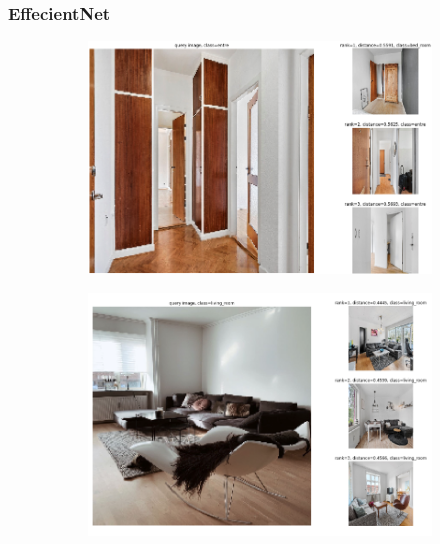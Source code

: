 \subsubsection{EffecientNet}
\begin{figure}[H]
    \centering
    \begin{subfigure}[b]{0.45\textwidth}
      \centering
      \includegraphics[width=\textwidth]{pictures/random/efnentreplot}
      \label{fig:1}
    \end{subfigure}
    \hfill
    \begin{subfigure}[b]{0.45\textwidth}
      \centering
      \includegraphics[width=\textwidth]{pictures/random/efnlivingplot}
      \label{fig:2}
    \end{subfigure}
    \hfill
    \begin{subfigure}[b]{0.45\textwidth}
      \centering

\end{subfigure}
\end{figure}
